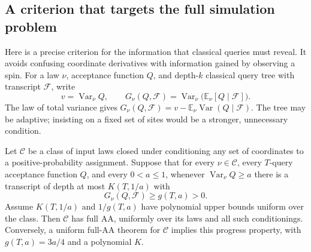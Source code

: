\subsection{A criterion that targets the full simulation problem}
\label{tht:reveal}

Here is a precise criterion for the information that classical queries
must reveal. It avoids confusing coordinate derivatives with information
gained by observing a spin. For a law $\nu$, acceptance function $Q$, and
depth-$k$ classical query tree with transcript $\mathcal F$, write
\[
 v=\operatorname{Var}_{\nu}Q,
 \qquad G_{\nu}(Q,\mathcal F)
   =\operatorname{Var}_{\nu}\bigl(\mathbb E_{\nu}[Q\mid\mathcal F]\bigr).
\]
The law of total variance gives
$G_{\nu}(Q,\mathcal F)=v-\mathbb E_{\nu}\operatorname{Var}(Q\mid\mathcal F)$.
The tree may be adaptive; insisting on a fixed set of sites would be a
stronger, unnecessary condition.

\begin{proposition}
\label{tht:reveal-prop}
Let $\mathcal C$ be a class of input laws closed under conditioning any
set of coordinates to a positive-probability assignment. Suppose that
for every $\nu\in\mathcal C$, every $T$-query acceptance function $Q$,
and every $0<a\le1$, whenever $\operatorname{Var}_{\nu}Q\ge a$ there is
a transcript of depth at most $K(T,1/a)$ with
\[
 G_{\nu}(Q,\mathcal F)\ge g(T,a)>0.
\]
Assume $K(T,1/a)$ and $1/g(T,a)$ have polynomial upper bounds uniform
over the class. Then $\mathcal C$ has full AA, uniformly over its laws
and all such conditionings. Conversely, a uniform full-AA theorem for
$\mathcal C$ implies this progress property, with $g(T,a)=3a/4$ and a
polynomial $K$.
\end{proposition}

